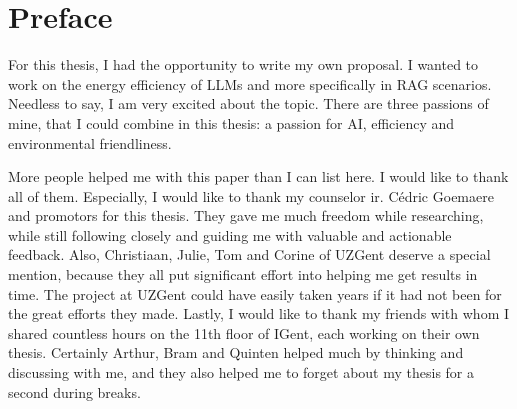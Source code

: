
\titleformat{\chapter}{}{}{0em}{\bf\Huge}
\chapter*{Preface}

For this thesis, I had the opportunity to write my own proposal. I wanted to work on the energy efficiency of LLMs and more specifically in RAG scenarios. Needless to say, I am very excited about the topic. There are three passions of mine, that I could combine in this thesis: a passion for AI, efficiency and environmental friendliness. 

More people helped me with this paper than I can list here. I would like to thank all of them. Especially, I would like to thank my counselor ir. Cédric Goemaere and promotors for this thesis. They gave me much freedom while researching, while still following closely and guiding me with valuable and actionable feedback. Also, Christiaan, Julie, Tom and Corine of UZGent deserve a special mention, because they all put significant effort into helping me get results in time. The project at UZGent could have easily taken years if it had not been for the great efforts they made. Lastly, I would like to thank my friends with whom I shared countless hours on the 11th floor of IGent, each working on their own thesis. Certainly Arthur, Bram and Quinten helped much by thinking and discussing with me, and they also helped me to forget about my thesis for a second during breaks.